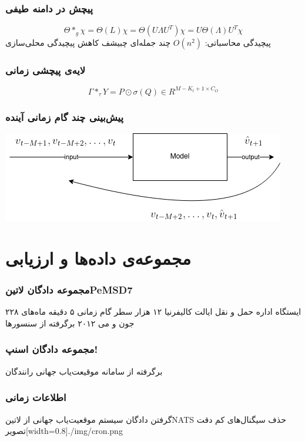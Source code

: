\documentclass{beamer}
\begin{document}
\begin{frame}
  \frametitle{پیچش در دامنه طیفی}
  \begin{equation}
    \Theta *_{g} \chi = \Theta(L)\chi = \Theta(U \Lambda U^{T})\chi = U\Theta(\Lambda)U^{T}\chi
    \label{eq:convolution}
  \end{equation}
     پیچیدگی محاسباتی: $O(n^{2})$
     چند جمله‌ای چبیشف
       کاهش پیچیدگی
       محلی‌سازی
\end{frame}

\begin{frame}
  \frametitle{لایه‌ی پیچشی زمانی}
  \begin{equation}
    \Gamma *_{\tau} Y = P \odot \sigma (Q) \in R^{M-K_{t}+1 \times C_{O}}
    \label{eq:time-conv}
  \end{equation}
\end{frame}

\begin{frame}
  \frametitle{پیش‌بینی چند گام زمانی آینده}
  \includegraphics[width=\textwidth]{./img/recursive.png}
\end{frame}

\section{مجموعه‌ی داده‌ها و ارزیابی}

\begin{frame}
  \frametitle{مجموعه دادگان ‌لاتین{PeMSD7}}
   ۲۲۸ ایستگاه اداره حمل و نقل ایالت کالیفرنیا
   ۱۲ هزار سطر
   گام زمانی ۵ دقیقه
   ماه‌های جون و می ۲۰۱۲
   برگرفته از سنسورها
\end{frame}

\begin{frame}
  \frametitle{مجموعه دادگان اسنپ!}
   برگرفته از سامانه موقیعت‌یاب جهانی رانندگان
\end{frame}

\begin{frame}
  \frametitle{اطلاعات زمانی}
   گرفتن دادگان سیستم موقعیت‌یاب جهانی از ‌لاتین{NATS}
   حذف سیگنال‌های کم دقت
  ‌تصویر[width=0.8\textwidth]{./img/cron.png}
\end{frame}
\end{document}
